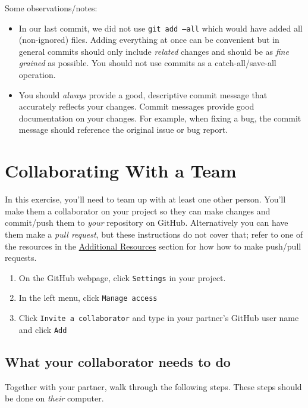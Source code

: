 \documentclass[12pt]{scrartcl}
\begin{document}
Some observations/notes:

\begin{itemize} 
  \item In our last commit, we did not use \texttt{git add --all} 
  which would have added all (non-ignored) files.  Adding everything at once
  can be convenient but in general commits should only include \emph{related}
  changes and should be as \emph{fine grained} as possible.  You should
  not use commits as a catch-all/save-all operation.

  \item You should \emph{always} provide a good, descriptive commit message
  that accurately reflects your changes.  Commit messages provide good
  documentation on your changes.  For example, when fixing a bug, the commit
  message should reference the original issue or bug report.  

\end{itemize}

\section{Collaborating With a Team}

In this exercise, you'll need to team up with at least one other person.
You'll make them a collaborator on your project so they can make changes
and commit/push them to \emph{your} repository on GitHub.  Alternatively
you can have them make a \emph{pull request}, but these instructions do 
not cover that; refer to one of the resources in the 
\hyperref[section:additionalResources]{Additional Resources} section
for how how to make push/pull requests.

\begin{enumerate}
  \item On the GitHub webpage, click \texttt{Settings} in your project.
  \item In the left menu, click \texttt{Manage access}
  \item Click \texttt{Invite a collaborator} and type 
  in your partner's GitHub user name and click \texttt{Add}
\end{enumerate}

\subsection{What your collaborator needs to do}

Together with your partner, walk through the following steps.  These
steps should be done on \emph{their} computer.
\end{document}
